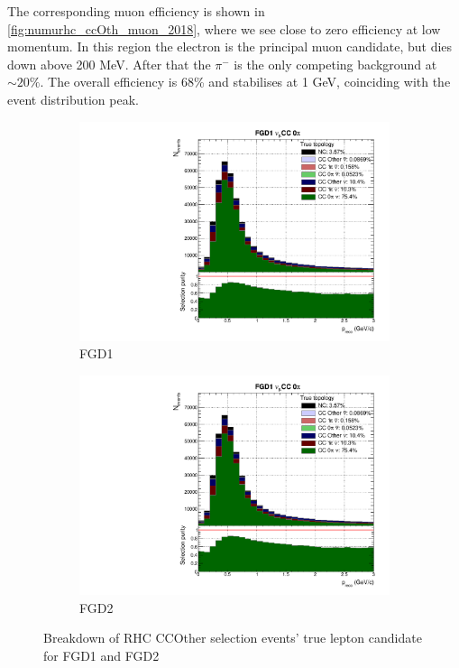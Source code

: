 The corresponding muon efficiency is shown in \autoref{fig:numurhc_ccOth_muon_2018}, where we see close to zero efficiency at low momentum. In this region the electron is the principal muon candidate, but dies down above 200 MeV. After that the $\pi^-$ is the only competing background at $\sim20\%$. The overall efficiency is 68\% and stabilises at 1 GeV, coinciding with the event distribution peak.
\begin{figure}[h]
	\begin{subfigure}[t]{0.49\textwidth}
		\includegraphics[width=\textwidth,page=30, trim={0mm 0mm 0mm 9mm}, clip]{figures/mach3/2018/Selection/2018_RedNDmatrix_rebin_verbose_may_noweights_diagnostics}
		\caption{FGD1}
	\end{subfigure}
	\begin{subfigure}[t]{0.49\textwidth}
		\includegraphics[width=\textwidth,page=36, trim={0mm 0mm 0mm 9mm}, clip]{figures/mach3/2018/Selection/2018_RedNDmatrix_rebin_verbose_may_noweights_diagnostics}
		\caption{FGD2}
	\end{subfigure}
	\caption{Breakdown of \numu RHC CCOther selection events' true lepton candidate for FGD1 and FGD2}
	\label{fig:numurhc_ccOth_muon_2018}
\end{figure}

